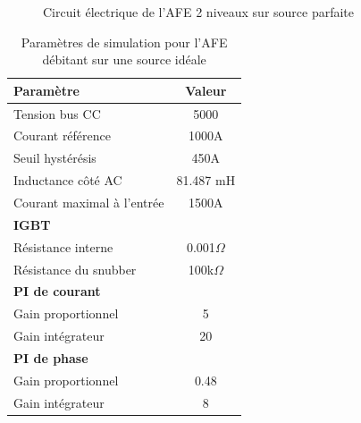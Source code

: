 \begin{figure}[htb]
\caption{Circuit électrique de l'AFE 2 niveaux sur source parfaite}
\label{circuit_AFE_IDEAL}
\end{figure}


\begin{table}[htb]
\centering
\begin{tabular}{|l|c|} 
  \hline
  \textbf{Paramètre} & \textbf{Valeur}  \\
  \hline\hline
  Tension bus CC & 5000\\ \hline
  Courant référence & 1000A\\ \hline
  Seuil hystérésis & 450A\\ \hline
  Inductance côté AC& 81.487 mH\\ \hline
  Courant maximal à l'entrée& 1500A \\ \hline \hline
  \multicolumn{2}{|l|}{\textbf{IGBT}}\\ \hline
  Résistance interne & 0.001$\Omega$\\
  Résistance du snubber & 100k$\Omega$\\ \hline \hline
   \multicolumn{2}{|l|}{\textbf{PI de courant}}\\ \hline
  Gain proportionnel & 5 \\
  Gain intégrateur & 20 \\ \hline \hline
  \multicolumn{2}{|l|}{\textbf{PI de phase}}\\ \hline
  Gain proportionnel & 0.48 \\
  Gain intégrateur & 8 \\ \hline \hline
  \hline
\end{tabular}
\caption{Paramètres de simulation pour l'AFE débitant sur une source idéale}
\label{p_AF_ID}
\end{table}
\clearpage

